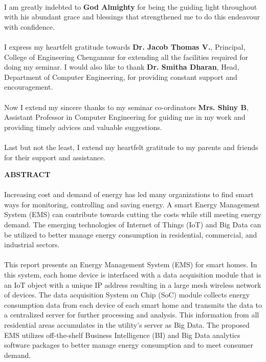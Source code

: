 \documentclass[a4paper,12pt,oneside]{article}
\begin{document}
\paragraph{}
I am greatly indebted to \textbf{God Almighty} for being the guiding light throughout with his
abundant grace and blessings that strengthened me to do this endeavour with confidence.
\paragraph{}
I express my heartfelt gratitude towards \textbf{Dr. Jacob Thomas V.}, Principal, College
of Engineering Chengannur for extending all the facilities required for doing my seminar.
I would also like to thank \textbf{Dr. Smitha Dharan}, Head, Department of Computer
Engineering, for providing constant support and encouragement.
\paragraph{}
Now I extend my sincere thanks to my seminar co-ordinators \textbf{Mrs. Shiny B}, Assistant
Professor in Computer Engineering for guiding me in my work and providing timely
advices and valuable suggestions.
\paragraph{}
Last but not the least, I extend my heartfelt gratitude to my parents and friends for
their support and assistance.	

\newpage
\begin{center}
\large{\textbf{ABSTRACT}}
\end{center}
\vspace{4ex}
\paragraph{}
Increasing cost and demand of energy has led many
organizations to find smart ways for monitoring, controlling and
saving energy. A smart Energy Management System (EMS) can
contribute towards cutting the costs while still meeting energy
demand. The emerging technologies of Internet of Things (IoT)
and Big Data can be utilized to better manage energy
consumption in residential, commercial, and industrial sectors.
\paragraph{}
This report presents an Energy Management System (EMS) for
smart homes. In this system, each home device is interfaced with
a data acquisition module that is an IoT object with a unique IP
address resulting in a large mesh wireless network of devices.
The data acquisition System on Chip (SoC) module collects
energy consumption data from each device of each smart home
and transmits the data to a centralized server for further
processing and analysis. This information from all residential
areas accumulates in the utility’s server as Big Data. The
proposed EMS utilizes off-the-shelf Business Intelligence (BI) and
Big Data analytics software packages to better manage energy
consumption and to meet consumer demand.
\setlength{\baselineskip}{1.0\baselineskip}
\end{document}
